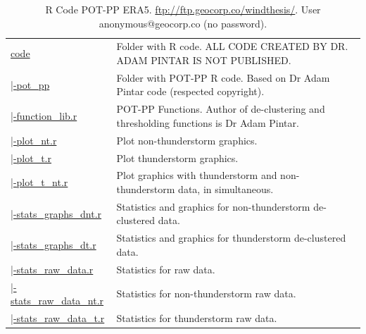 \documentclass[12pt,oneside]{reedthesis}
\begin{document}
\begingroup\fontsize{7}{9}\selectfont
\begin{longtable}[t]{>{\raggedright\arraybackslash}p{1.3in}>{\raggedright\arraybackslash}p{4.9in}}
\caption[R Code POT-PP ERA5]{\label{tab:codeera5}R Code POT-PP ERA5. \href{ftp://ftp.geocorp.co/windthesis/}{ftp://ftp.geocorp.co/windthesis/}. User anonymous@geocorp.co (no password).}\\
\toprule
\multicolumn{1}{l}{Folder Tree - Ftp Links} & \multicolumn{1}{l}{Description}\\
\midrule
\href{ftp://ftp.geocorp.co/windthesis/code/}{code} & Folder with R code. ALL CODE CREATED BY DR. ADAM PINTAR IS NOT PUBLISHED.\\
\href{ftp://ftp.geocorp.co/windthesis/code/pot_pp/}{\;\;|-pot\_pp} & Folder with POT-PP R code. Based on Dr Adam Pintar code (respected copyright).\\
\href{ftp://ftp.geocorp.co/windthesis/code/pot_pp/function_lib.r}{\;\;\;\;|-function\_lib.r} & POT-PP Functions. Author of de-clustering and thresholding functions is Dr Adam Pintar.\\
\href{ftp://ftp.geocorp.co/windthesis/code/pot_pp/plot_nt.r}{\;\;\;\;|-plot\_nt.r} & Plot non-thunderstorm graphics.\\
\href{ftp://ftp.geocorp.co/windthesis/code/pot_pp/plot_t.r}{\;\;\;\;|-plot\_t.r} & Plot thunderstorm graphics.\\
\href{ftp://ftp.geocorp.co/windthesis/code/pot_pp/plot_t_nt.r}{\;\;\;\;|-plot\_t\_nt.r} & Plot graphics with thunderstorm and non-thunderstorm data, in simultaneous.\\
\href{ftp://ftp.geocorp.co/windthesis/code/pot_pp/statistics_and_graphics_declustered_nt.r}{\;\;\;\;|-stats\_graphs\_dnt.r} & Statistics and graphics for non-thunderstorm de-clustered data.\\
\href{ftp://ftp.geocorp.co/windthesis/code/pot_pp/statistics_and_graphics_declustered_t.r}{\;\;\;\;|-stats\_graphs\_dt.r} & Statistics and graphics for thunderstorm de-clustered data.\\
\href{ftp://ftp.geocorp.co/windthesis/code/pot_pp/statistics_raw_data.r}{\;\;\;\;|-stats\_raw\_data.r} & Statistics for raw data.\\
\href{ftp://ftp.geocorp.co/windthesis/code/pot_pp/statistics_raw_data_nt.r}{\;\;\;\;|-stats\_raw\_data\_nt.r} & Statistics for non-thunderstorm raw data.\\
\href{ftp://ftp.geocorp.co/windthesis/code/pot_pp/statistics_raw_data_t.r}{\;\;\;\;|-stats\_raw\_data\_t.r} & Statistics for thunderstorm raw data.\\

\end{longtable}
\end{document}
